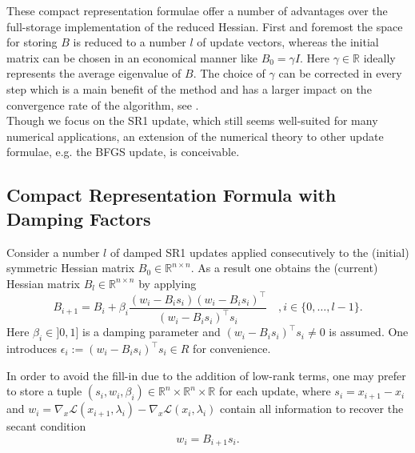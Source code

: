 \documentclass{svmult}
\begin{document}
\noindent These compact representation formulae offer a number of advantages over the full-storage implementation of the reduced Hessian. First and foremost the space for storing $B$ is reduced to a number $l$ of update vectors, whereas the initial matrix can be chosen in an economical manner like $B_0= \gamma I$. Here  $\gamma \in \mathbb{R}$ ideally represents the average eigenvalue of $B$. The choice of $\gamma$ can be corrected in every step which is a main benefit of the method and has a larger impact on the convergence rate of the algorithm, see \cite{tb:VOLKER}. \\

\noindent Though we focus on the SR1 update, which still seems  well-suited for many numerical applications, an extension of the numerical theory 
to other update formulae, e.g. the BFGS update, is conceivable.

\subsection{Compact Representation Formula with Damping Factors}
 
\noindent Consider a number $l$ of damped SR1 updates applied consecutively to the (initial) symmetric Hessian matrix $B_0 \in \mathbb{R}^{n \times n}$. As a result one obtains the (current) Hessian matrix $B_l \in \mathbb{R}^{n \times n}$ by applying
\begin{equation}
\label{SR1-update}
	B_{i+1}=B_{i}+\beta_i \frac{(w_i-B_i s_i)(w_i -B_i s_i)^{\top}}{(w_i-B_i s_i)^{\top}s_i} \quad , i \in \{ 0, \ldots , l-1 \} .
\end{equation}
Here $\beta_i \in ]0,1]$ is a damping parameter and $(w_i-B_i s_i)^{\top}s_i \neq 0$ is assumed. One introduces $\epsilon_i := {(w_i-B_i s_i)^{\top}s_i}\in R$ for convenience.

 \noindent In order to avoid the fill-in due to the addition of low-rank terms, one may prefer to store a tuple $(s_i, w_i, \beta_i)\in \mathbb{R}^{n} \times \mathbb{R}^{n} \times \mathbb{R}$ for each update, where $s_i=x_{i+1}-x_i$ and $w_i=\nabla_x \mathcal L(x_{i+1},\lambda_i)-\nabla_x \mathcal L(x_i,\lambda_i)$ contain all information to recover the secant condition \[w_i=B_{i+1} s_i.\]
\end{document}
